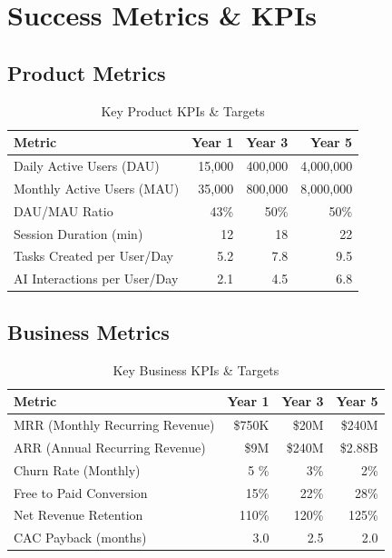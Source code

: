 \section{Success Metrics \& KPIs}

\subsection{Product Metrics}

\begin{table}[H]
\centering
\caption{Key Product KPIs \& Targets}
\begin{tabular}{|l|r|r|r|}
\hline
\rowcolor{lightgray}
\textbf{Metric} & \textbf{Year 1} & \textbf{Year 3} & \textbf{Year 5} \\
\hline
Daily Active Users (DAU) & 15,000 & 400,000 & 4,000,000 \\
\hline
Monthly Active Users (MAU) & 35,000 & 800,000 & 8,000,000 \\
\hline
DAU/MAU Ratio & 43\% & 50\% & 50\% \\
\hline
Session Duration (min) & 12 & 18 & 22 \\
\hline
Tasks Created per User/Day & 5.2 & 7.8 & 9.5 \\
\hline
AI Interactions per User/Day & 2.1 & 4.5 & 6.8 \\
\hline
\end{tabular}
\end{table}

\subsection{Business Metrics}

\begin{table}[H]
\centering
\caption{Key Business KPIs \& Targets}
\begin{tabular}{|l|r|r|r|}
\hline
\rowcolor{lightgray}
\textbf{Metric} & \textbf{Year 1} & \textbf{Year 3} & \textbf{Year 5} \\
\hline
MRR (Monthly Recurring Revenue) & \$750K & \$20M & \$240M \\
\hline
ARR (Annual Recurring Revenue) & \$9M & \$240M & \$2.88B \\
\hline
Churn Rate (Monthly) & 5
\% & 3\% & 2\% \\
\hline
Free to Paid Conversion & 15\% & 22\% & 28\% \\
\hline
Net Revenue Retention & 110\% & 120\% & 125\% \\
\hline
CAC Payback (months) & 3.0 & 2.5 & 2.0 \\
\hline
\end{tabular}
\end{table}

